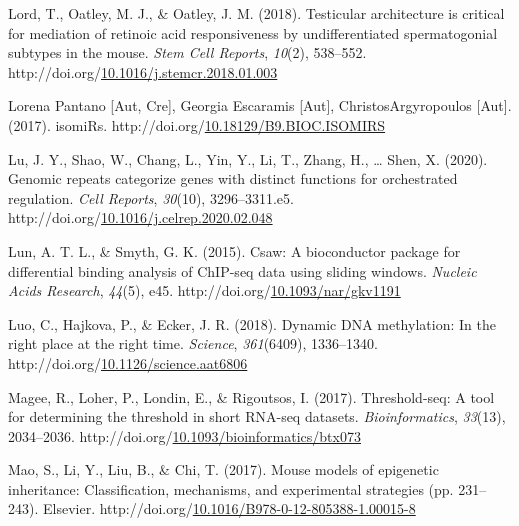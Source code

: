 \documentclass[12pt,twoside]{reedthesis}
\newlength{\cslhangindent}
\newenvironment{CSLReferences}[2] %
 {%
  \setlength{\parindent}{0pt}
  \ifodd #1 \everypar{\setlength{\hangindent}{\cslhangindent}}\ignorespaces\fi
  \ifnum #2 > 0
  \setlength{\parskip}{#2\baselineskip}
  \fi
 }%
 {}
\begin{document}
\begin{CSLReferences}{1}{0}
\leavevmode{}%
Lord, T., Oatley, M. J., \& Oatley, J. M. (2018). Testicular architecture is critical for mediation of retinoic acid responsiveness by undifferentiated spermatogonial subtypes in the mouse. \emph{Stem Cell Reports}, \emph{10}(2), 538--552. http://doi.org/\href{https://doi.org/10.1016/j.stemcr.2018.01.003}{10.1016/j.stemcr.2018.01.003}

\leavevmode{}%
Lorena Pantano {[}Aut, Cre{]}, Georgia Escaramis {[}Aut{]}, ChristosArgyropoulos {[}Aut{]}. (2017). isomiRs. http://doi.org/\href{https://doi.org/10.18129/B9.BIOC.ISOMIRS}{10.18129/B9.BIOC.ISOMIRS}

\leavevmode{}%
Lu, J. Y., Shao, W., Chang, L., Yin, Y., Li, T., Zhang, H., \ldots{} Shen, X. (2020). Genomic repeats categorize genes with distinct functions for orchestrated regulation. \emph{Cell Reports}, \emph{30}(10), 3296--3311.e5. http://doi.org/\href{https://doi.org/10.1016/j.celrep.2020.02.048}{10.1016/j.celrep.2020.02.048}

\leavevmode{}%
Lun, A. T. L., \& Smyth, G. K. (2015). Csaw: A bioconductor package for differential binding analysis of ChIP-seq data using sliding windows. \emph{Nucleic Acids Research}, \emph{44}(5), e45. http://doi.org/\href{https://doi.org/10.1093/nar/gkv1191}{10.1093/nar/gkv1191}

\leavevmode{}%
Luo, C., Hajkova, P., \& Ecker, J. R. (2018). Dynamic DNA methylation: In the right place at the right time. \emph{Science}, \emph{361}(6409), 1336--1340. http://doi.org/\href{https://doi.org/10.1126/science.aat6806}{10.1126/science.aat6806}

\leavevmode{}%
Magee, R., Loher, P., Londin, E., \& Rigoutsos, I. (2017). Threshold-seq: A tool for determining the threshold in short RNA-seq datasets. \emph{Bioinformatics}, \emph{33}(13), 2034--2036. http://doi.org/\href{https://doi.org/10.1093/bioinformatics/btx073}{10.1093/bioinformatics/btx073}

\leavevmode{}%
Mao, S., Li, Y., Liu, B., \& Chi, T. (2017). Mouse models of epigenetic inheritance: Classification, mechanisms, and experimental strategies (pp. 231--243). Elsevier. http://doi.org/\href{https://doi.org/10.1016/B978-0-12-805388-1.00015-8}{10.1016/B978-0-12-805388-1.00015-8}


\end{CSLReferences}
\end{document}
